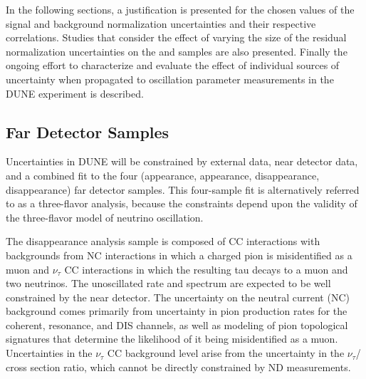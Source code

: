In the following sections, a justification is presented for the chosen values of the signal and background
normalization uncertainties and their respective correlations.
Studies that consider the effect of varying the size of the residual normalization
uncertainties on the \nue and \anue samples are also presented.
Finally the ongoing effort to characterize and evaluate the effect of individual sources
of uncertainty when propagated to oscillation parameter measurements in the DUNE experiment
is described.

\subsection{Far Detector Samples}
\label{sec:syst_just}
Uncertainties in DUNE will be constrained by external data, near detector data, and a combined
fit to the four (\nue appearance, \anue appearance, \numu disappearance, \anumu disappearance) far detector samples.
This four-sample fit is alternatively referred to as a three-flavor analysis, because the constraints depend
upon the validity of the three-flavor model of neutrino oscillation.

The \numu disappearance analysis sample is composed of \numu CC interactions with backgrounds from NC
interactions in which a charged pion is misidentified as a muon and $\nu_{\tau}$ CC interactions in which the resulting
tau decays to a muon and two neutrinos.
The unoscillated \numu rate and spectrum are expected to be well constrained by the near detector.
The uncertainty on the neutral current (NC) background comes primarily from uncertainty in pion production rates
for the coherent, resonance, and DIS channels, as well as modeling of pion topological signatures that
determine the likelihood of it being misidentified as a muon.
Uncertainties in the $\nu_{\tau}$ CC background level arise from the uncertainty in the $\nu_{\tau}$/\numu
cross section ratio, which cannot be directly constrained by ND measurements.

